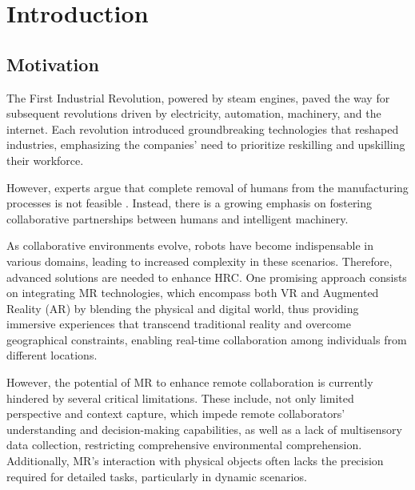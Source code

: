 \chapter{Introduction}%
\label{chapter:introduction}


\section{Motivation}
\label{section:Motivation}
% 
The First Industrial Revolution, powered by steam engines, paved the way for subsequent revolutions driven by electricity, automation, machinery, 
and the internet. Each revolution introduced groundbreaking technologies that reshaped industries, emphasizing the companies' need to prioritize reskilling 
and upskilling their workforce.

However, experts argue that complete removal of humans from the manufacturing processes is not feasible \cite{Weiss2021}. Instead, there is 
a growing emphasis on fostering collaborative partnerships between humans and intelligent machinery.

As collaborative environments evolve, robots have become indispensable in various domains, leading to increased complexity in these scenarios.  Therefore, advanced solutions are needed to enhance \ac{HRC}. 
One promising approach consists on integrating \ac{MR} technologies, which encompass both \ac{VR} and Augmented Reality (\ac{AR}) by blending the physical and digital world, thus providing immersive experiences that transcend traditional reality and overcome geographical constraints, enabling real-time collaboration among individuals from different locations.

However, the potential of \ac{MR} to enhance remote collaboration is currently hindered by several critical limitations. These include, not only limited perspective and context capture, which impede remote collaborators' understanding and decision-making capabilities, as well as a lack of multisensory data collection, restricting comprehensive environmental comprehension. 
Additionally, \ac{MR}'s interaction with physical objects often lacks the precision required for detailed tasks, particularly in dynamic scenarios. 

